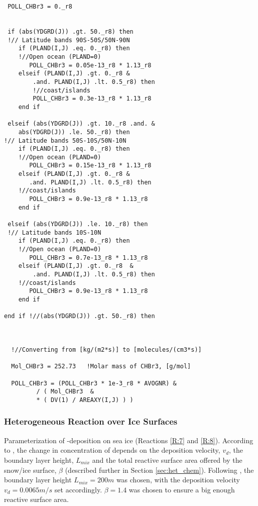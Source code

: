 \begin{lstlisting}
 POLL_CHBr3 = 0._r8

 
 if (abs(YDGRD(J)) .gt. 50._r8) then
 !// Latitude bands 90S-50S/50N-90N
    if (PLAND(I,J) .eq. 0._r8) then   
    !//Open ocean (PLAND=0)
       POLL_CHBr3 = 0.05e-13_r8 * 1.13_r8
    elseif (PLAND(I,J) .gt. 0._r8 &
        .and. PLAND(I,J) .lt. 0.5_r8) then
        !//coast/islands
        POLL_CHBr3 = 0.3e-13_r8 * 1.13_r8
    end if

 elseif (abs(YDGRD(J)) .gt. 10._r8 .and. &
    abs(YDGRD(J)) .le. 50._r8) then 
!// Latitude bands 50S-10S/50N-10N
    if (PLAND(I,J) .eq. 0._r8) then   
    !//Open ocean (PLAND=0)
       POLL_CHBr3 = 0.15e-13_r8 * 1.13_r8
    elseif (PLAND(I,J) .gt. 0._r8 &
       .and. PLAND(I,J) .lt. 0.5_r8) then
    !//coast/islands
       POLL_CHBr3 = 0.9e-13_r8 * 1.13_r8
    end if

 elseif (abs(YDGRD(J)) .le. 10._r8) then
 !// Latitude bands 10S-10N
    if (PLAND(I,J) .eq. 0._r8) then   
    !//Open ocean (PLAND=0)
       POLL_CHBr3 = 0.7e-13_r8 * 1.13_r8
    elseif (PLAND(I,J) .gt. 0._r8  & 
        .and. PLAND(I,J) .lt. 0.5_r8) then
    !//coast/islands
       POLL_CHBr3 = 0.9e-13_r8 * 1.13_r8
    end if

end if !//(abs(YDGRD(J)) .gt. 50._r8) then 



  !//Converting from [kg/(m2*s)] to [molecules/(cm3*s)]

  Mol_CHBr3 = 252.73   !Molar mass of CHBr3, [g/mol]

  POLL_CHBr3 = (POLL_CHBr3 * 1e-3_r8 * AVOGNR) &
         / ( Mol_CHBr3  &
         * ( DV(1) / AREAXY(I,J) ) )

\end{lstlisting}

\subsubsection{Heterogeneous Reaction over Ice Surfaces}\label{sec:impl_multiphase_react}

Parameterization of -deposition on sea ice (Reactions \ref{R:7} and \ref{R:8}). According to \cite{CAO}, the change in concentration of  depends on the deposition velocity, $v_d$, the boundary layer height, $L_{mix}$ and the total reactive surface area offered by the snow/ice surface, $\beta$ (described further in Section \ref{sec:het_chem}). Following \cite{CAO}, the boundary layer height $L_{mix} = 200 m$ was chosen, with  the deposition velocity $v_d = 0.0065 m/s$ set accordingly. $\beta = 1.4$ was chosen to ensure a big enough reactive surface area. 

